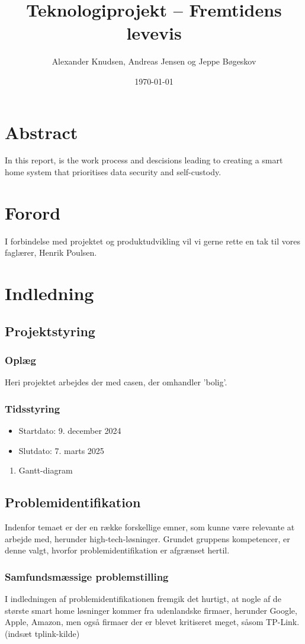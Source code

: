 \documentclass[11pt]{article}
\author{Alexander Knudsen, Andreas Jensen og Jeppe Bøgeskov}
\date{\today}
\title{Teknologiprojekt -- Fremtidens levevis}
\begin{document}


\restoregeometry
\tableofcontents
\newpage
\section{Abstract}
\label{sec:org6419ad8}
In this report, is the work process and descisions leading to creating a smart home system that prioritises data security and self-custody.
\newpage
\section{Forord}
\label{sec:org4e437e0}
I forbindelse med projektet og produktudvikling vil vi gerne rette en tak til vores faglærer, Henrik Poulsen.
\newpage
\section{Indledning}
\label{sec:org6d9531c}
\subsection{Projektstyring}
\label{sec:org5e3ff51}
\subsubsection{Oplæg}
\label{sec:orgbec7f1d}
Heri projektet arbejdes der med casen, der omhandler 'bolig'.
\subsubsection{Tidsstyring}
\label{sec:org730faaa}
\begin{itemize}
\item Startdato: 9. december 2024
\item Slutdato: 7. marts 2025
\end{itemize}
\begin{enumerate}
\item Gantt-diagram
\label{sec:orgb1d2daa}
\end{enumerate}
\subsection{Problemidentifikation}
\label{sec:orgfafb1b0}
Indenfor temaet er der en række forskellige emner, som kunne være relevante at arbejde med, herunder high-tech-løsninger. Grundet gruppens kompetencer, er denne valgt, hvorfor problemidentifikation er afgrænset hertil.
\subsubsection{Samfundsmæssige problemstilling}
\label{sec:orga952bf5}
I indledningen af problemidentifikationen fremgik det hurtigt, at nogle af de største smart home løsninger kommer fra udenlandske firmaer, herunder Google, Apple, Amazon, men også firmaer der er blevet kritiseret meget, såsom TP-Link. (indsæt tplink-kilde)
\end{document}
